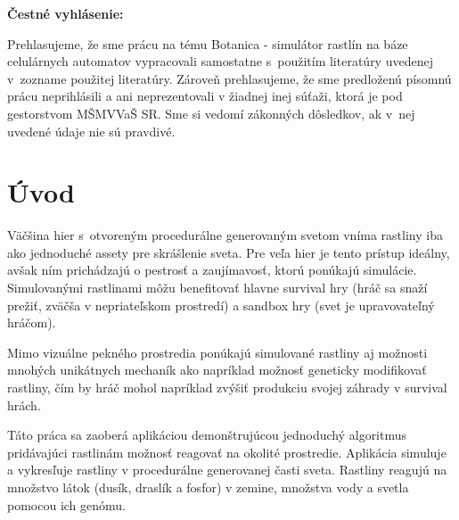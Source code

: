 \documentclass[12pt]{article}
\def\nazovprace{Botanica - simulátor rastlín na báze celulárnych automatov}
\begin{document}
\setcounter{page}{3}


\thispagestyle{empty}

\null
\vfill

\noindent
\textbf{Čestné vyhlásenie:}

Prehlasujeme, že sme prácu na tému
\nazovprace \space
vypracovali samostatne s~použitím literatúry uvedenej v~zozname použitej literatúry.
Zároveň prehlasujeme, že sme predloženú písomnú prácu neprihlásili a ani neprezentovali
v žiadnej inej súťaži, ktorá je pod gestorstvom MŠMVVaŠ SR. Sme si vedomí zákonných dôsledkov,
ak v~nej uvedené údaje nie sú pravdivé.

\vspace{4cm}

\newpage


%
%

% 
% 
% 
% 


\thispagestyle{empty}
\tableofcontents

%
%

\section*{Úvod}

Väčšina hier s~otvoreným procedurálne generovaným svetom vníma rastliny iba ako
jednoduché assety pre skrášlenie sveta. Pre veľa hier je tento prístup ideálny,
avšak ním prichádzajú o pestrosť a zaujímavosť, ktorú ponúkajú simulácie.
Simulovanými rastlinami môžu benefitovať hlavne survival hry (hráč sa snaží
prežiť, zväčša v nepriateľskom prostredí) a sandbox hry (svet je upravovateľný
hráčom).

Mimo vizuálne pekného prostredia ponúkajú simulované rastliny aj možnosti
mnohých unikátnych mechaník ako napríklad možnosť geneticky
modifikovať rastliny, čím by hráč mohol napríklad zvýšiť produkciu svojej záhrady
v survival hrách.

Táto práca sa zaoberá aplikáciou demonštrujúcou jednoduchý algoritmus
pridávajúci rastlinám možnosť reagovať na okolité prostredie. Aplikácia
simuluje a vykresľuje rastliny v procedurálne generovanej časti sveta.
Rastliny reagujú na množstvo látok (dusík, draslík a fosfor) v zemine,
množstva vody a svetla pomocou ich genómu.
\end{document}
